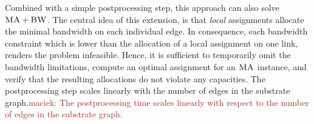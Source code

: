 \documentclass[9pt]{sigcomm-alternate}
\newcommand{\maciek}[1]{\textcolor{brown}{maciek: #1}}
\newcommand{\stefan}[1]{\textcolor{blue}{stefan: #1}}
\newcommand{\VmChunkAssignment}{\mu}
\newcommand{\VirtualNode}{v}
\newcommand{\achunk}{\ensuremath{c}}
\newcommand{\CC}{\textsc{NI}}
\newcommand{\BW}{\textsc{BW}}
\newcommand{\MA}{\textsc{MA}}
\begin{document}
%
%
%
%
%
%

Combined with a simple postprocessing step, this approach can also solve $\MA+\BW$. The central idea of this extension, is
that \emph{local} assignments allocate the minimal bandwidth
on each individual edge. In consequence, each bandwidth constraint
which is lower than the allocation of a local assignment on one link, renders
the problem infeasible. Hence, it is sufficient to temporarily omit the
bandwidth limitations, compute an optimal assignment for an $\MA$ instance, and
verify that the resulting allocations do not violate any capacities. The
postprocessing step scales linearly with the number of edges in the substrate
graph.\maciek{The postprocessing time scales linearly with respect to the number of edges in the substrate graph.}
\end{document}
